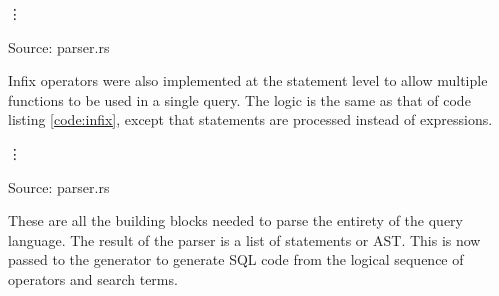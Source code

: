 \begin{codeenv}
    \label{code:group}
    
    \vdots
    
    \centerline{Source: parser.rs}
\end{codeenv}
Infix operators were also implemented at the statement level to allow multiple functions to be used in a single query. The logic is the same as that of code listing \ref{code:infix}, except that statements are processed instead of expressions.
\begin{codeenv}
    \label{code:infix-stat}
    
    \vdots
    
    \centerline{Source: parser.rs}
\end{codeenv}
These are all the building blocks needed to parse the entirety of the query language. The result of the parser is a list of statements or \ac{AST}. This is now passed to the generator to generate SQL code from the logical sequence of operators and search terms.